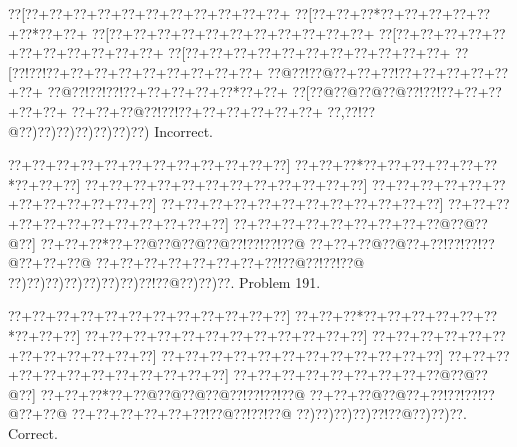 \documentclass[a5paper]{article}
\begin{document}
\begin{center}
{\goo
\0??[\0??+\0??+\0??+\0??+\0??+\0??+\0??+\0??+\0??+\0??+\0??+
\0??[\0??+\0??+\0??*\0??+\0??+\0??+\0??+\0??+\0??*\0??+\0??+
\0??[\0??+\0??+\0??+\0??+\0??+\0??+\0??+\0??+\0??+\0??+\0??+
\0??[\0??+\0??+\0??+\0??+\0??+\0??+\0??+\0??+\0??+\0??+\0??+
\0??[\0??+\0??+\0??+\0??+\0??+\0??+\0??+\0??+\0??+\0??+\0??+
\0??[\0??!\0??!\0??+\0??+\0??+\0??+\0??+\0??+\0??+\0??+\0??+
\0??@\0??!\0??@\0??+\0??+\0??!\0??+\0??+\0??+\0??+\0??+\0??+
\0??@\0??!\0??!\0??!\0??+\0??+\0??+\0??+\0??*\0??+\0??+
\0??[\0??@\0??@\0??@\0??@\0??!\0??!\0??+\0??+\0??+\0??+\0??+
\0??+\0??+\0??@\0??!\0??!\0??+\0??+\0??+\0??+\0??+\0??+
\0??,\0??!\0??@\0??)\0??)\0??)\0??)\0??)\0??)\0??)
}
Incorrect. 

\end{center}
\newpage
\begin{center}
{\goo
\0??+\0??+\0??+\0??+\0??+\0??+\0??+\0??+\0??+\0??+\0??+\0??]
\0??+\0??+\0??*\0??+\0??+\0??+\0??+\0??+\0??*\0??+\0??+\0??]
\0??+\0??+\0??+\0??+\0??+\0??+\0??+\0??+\0??+\0??+\0??+\0??]
\0??+\0??+\0??+\0??+\0??+\0??+\0??+\0??+\0??+\0??+\0??+\0??]
\0??+\0??+\0??+\0??+\0??+\0??+\0??+\0??+\0??+\0??+\0??+\0??]
\0??+\0??+\0??+\0??+\0??+\0??+\0??+\0??+\0??+\0??+\0??+\0??]
\0??+\0??+\0??+\0??+\0??+\0??+\0??+\0??+\0??@\0??@\0??@\0??]
\0??+\0??+\0??*\0??+\0??@\0??@\0??@\0??@\0??!\0??!\0??!\0??@
\0??+\0??+\0??@\0??@\0??+\0??!\0??!\0??!\0??@\0??+\0??+\0??@
\0??+\0??+\0??+\0??+\0??+\0??+\0??+\0??!\0??@\0??!\0??!\0??@
\0??)\0??)\0??)\0??)\0??)\0??)\0??)\0??!\0??@\0??)\0??)\0??.
}
Problem 191.

\end{center}
\begin{center}
{\goo
\0??+\0??+\0??+\0??+\0??+\0??+\0??+\0??+\0??+\0??+\0??+\0??]
\0??+\0??+\0??*\0??+\0??+\0??+\0??+\0??+\0??*\0??+\0??+\0??]
\0??+\0??+\0??+\0??+\0??+\0??+\0??+\0??+\0??+\0??+\0??+\0??]
\0??+\0??+\0??+\0??+\0??+\0??+\0??+\0??+\0??+\0??+\0??+\0??]
\0??+\0??+\0??+\0??+\0??+\0??+\0??+\0??+\0??+\0??+\0??+\0??]
\0??+\0??+\0??+\0??+\0??+\0??+\0??+\0??+\0??+\0??+\0??+\0??]
\0??+\0??+\0??+\0??+\0??+\0??+\0??+\0??+\0??@\0??@\0??@\0??]
\0??+\0??+\0??*\0??+\0??@\0??@\0??@\0??@\0??!\0??!\0??!\0??@
\0??+\0??+\0??@\0??@\0??+\0??!\0??!\0??!\0??@\0??+\0??@
\0??+\0??+\0??+\0??+\0??+\0??!\0??@\0??!\0??!\0??@
\0??)\0??)\0??)\0??)\0??!\0??@\0??)\0??)\0??.
}
Correct. 

\end{center}
\end{document}
